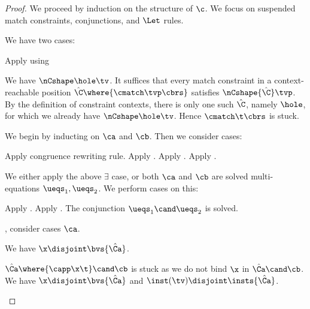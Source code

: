 \documentclass[acmsmall,screen,nonacm%
\Anonymous{,anonymous}{}%
\Final{}{,review}%
]{acmart}
\begin{document}
\begin{proof}
  We proceed by induction on the structure of $\c$. We
  focus on suspended match constraints, conjunctions, and $\Let$ rules.
  \begin{proofcases}
    \proofcase{$\cmatch \t \cbrs$}
      We have two cases:
      \begin{proofcases}
   Apply  using 

	  We have $\nCshape \hole \tv$. It suffices
	  that every match constraint in a context-reachable position
	  $\hat\C\where{\cmatch \tvp \cbrs}$ satisfies $\nCshape {\hat\C} \tvp$.
	  By the definition of constraint contexts, there is only one such
	  $\hat\C$, namely $\hole$, for which we already have $\nCshape \hole \tv$.
	  Hence $\cmatch \t \cbrs$ is stuck.
      \end{proofcases}

    \proofcase{$\ca \cand \cb$}
    We begin by inducting on $\ca$ and $\cb$. Then we consider cases:
    \begin{proofcases}
       Apply congruence rewriting rule.
       Apply .
       Apply .
       Apply .

	We either apply the above $\exists$ case, or both $\ca$ and $\cb$ are solved
	multi-equations $\ueqs_1, \ueqs_2$. We perform cases on this:
	\begin{proofcases}
	   Apply .
	   Apply .
	   The conjunction $\ueqs_1 \cand \ueqs_2$ is solved.
	\end{proofcases}


	\Wlog, consider cases $\ca$.
	\begin{proofcases}
	  \proofcase{$\hat\Ca\where{\capp \x \t}$}
	    We have $\x \disjoint \bvs {\hat\Ca}$.

	    $\hat\Ca\where{\capp \x \t} \cand \cb$ is stuck as we do not bind $\x$ in $\hat\Ca \cand \cb$.
	  \proofcase{$\hat\Ca\where{\cpapp \x \tv \tvc \inst}$}
      We have $\x \disjoint \bvs {\hat \Ca}$ and $\inst(\tv) \disjoint \insts {\hat \Ca}$.


\end{proofcases}
\end{proofcases}
\end{proofcases}
\end{proof}
\end{document}
